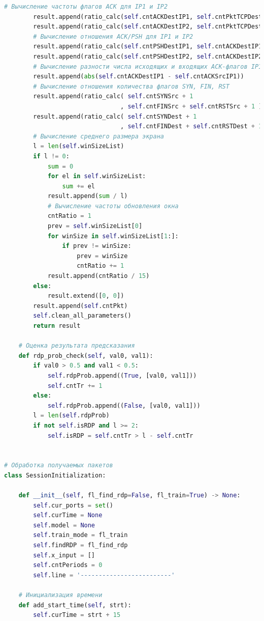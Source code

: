 \documentclass[spec, och, diploma]{SCWorks}
\begin{document}
\begin{lstlisting}[language=Python]
        # Вычисление частоты флагов ACK для IP1 и IP2
        result.append(ratio_calc(self.cntACKDestIP1, self.cntPktTCPDestIP1))
        result.append(ratio_calc(self.cntACKDestIP2, self.cntPktTCPDestIP2))
        # Вычисление отношения ACK/PSH для IP1 и IP2
        result.append(ratio_calc(self.cntPSHDestIP1, self.cntACKDestIP1))
        result.append(ratio_calc(self.cntPSHDestIP2, self.cntACKDestIP2))
        # Вычисление разности числа исходящих и входящих ACK-флагов IP1
        result.append(abs(self.cntACKDestIP1 - self.cntACKSrcIP1))
        # Вычисление отношения количества флагов SYN, FIN, RST
        result.append(ratio_calc( self.cntSYNSrc + 1
                                , self.cntFINSrc + self.cntRSTSrc + 1 ))
        result.append(ratio_calc( self.cntSYNDest + 1
                                , self.cntFINDest + self.cntRSTDest + 1 ))
        # Вычисление среднего размера экрана
        l = len(self.winSizeList)
        if l != 0:
            sum = 0
            for el in self.winSizeList:
                sum += el
            result.append(sum / l)
            # Вычисление частоты обновления окна
            cntRatio = 1
            prev = self.winSizeList[0]
            for winSize in self.winSizeList[1:]:
                if prev != winSize:
                    prev = winSize
                    cntRatio += 1
            result.append(cntRatio / 15)
        else:
            result.extend([0, 0])
        result.append(self.cntPkt)
        self.clean_all_parameters()
        return result

    # Оценка результата предсказания
    def rdp_prob_check(self, val0, val1):
        if val0 > 0.5 and val1 < 0.5:
            self.rdpProb.append((True, [val0, val1]))
            self.cntTr += 1
        else:
            self.rdpProb.append((False, [val0, val1]))
        l = len(self.rdpProb)
        if not self.isRDP and l >= 2:
            self.isRDP = self.cntTr > l - self.cntTr


# Обработка получаемых пакетов
class SessionInitialization:

    def __init__(self, fl_find_rdp=False, fl_train=True) -> None:
        self.cur_ports = set()
        self.curTime = None
        self.model = None
        self.train_mode = fl_train
        self.findRDP = fl_find_rdp
        self.x_input = []
        self.cntPeriods = 0
        self.line = '-------------------------'

    # Инициализация времени
    def add_start_time(self, strt):
        self.curTime = strt + 15


\end{lstlisting}
\end{document}
